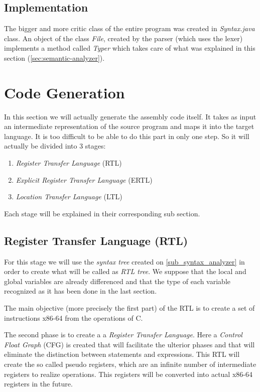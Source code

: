 \documentclass[conference]{IEEEtran}
\theoremstyle{definition}
\begin{document}
\subsection{Implementation}
The bigger and more critic class of the entire program was created in \textit{Syntax.java} class. An object of the class \textit{File}, created by the parser (which uses the lexer) implements a method called \textit{Typer} which takes care of what was explained in this section (\ref{sec:semantic-analyzer}).


\section{Code Generation}
In this section we will actually generate the assembly code itself. It takes as input an intermediate representation of the source program and maps it into the target language. 
It is too difficult to be able to do this part in only one step. So it will actually be divided into 3 stages:
\begin{enumerate}
	\item \textit{Register Transfer Language} (RTL)
	\item \textit{Explicit Register Transfer Language} (ERTL)
	\item \textit{Location Transfer Language} (LTL)
\end{enumerate}
Each stage will be explained in their corresponding sub section.

\subsection{Register Transfer Language (RTL)} \label{sec:RTL}
For this stage we will use the \textit{syntax tree} created on \ref{sub_syntax_analyzer} in order to create what will be called as \textit{RTL tree}. We suppose that the local and global variables are already differenced and that the type of each variable recognized as it has been done in the last section.

The main objective (more precisely the first part) of the RTL is to create a set of instructions x86-64 from the operations of C.

The second phase is to create a a \textit{Register Transfer Language}. Here a \textit{Control Float Graph} (CFG) is created that will facilitate the ulterior phases and that will eliminate the distinction between statements and expressions. This RTL will create the so called pseudo registers, which are an infinite number of intermediate registers to realize operations. This registers will be converted into actual x86-64 registers in the future.
\end{document}
